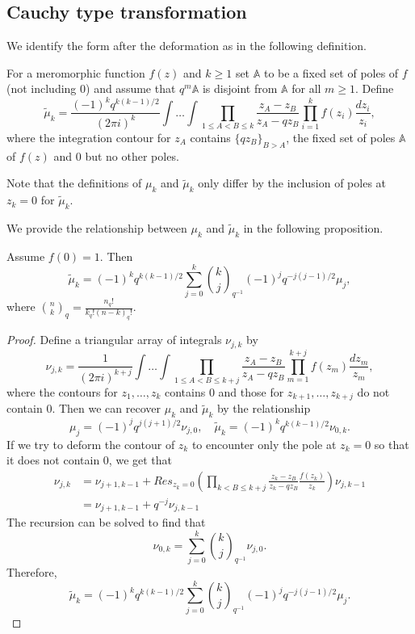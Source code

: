 \subsection{Cauchy type transformation}
We identify the form after the deformation as in the following definition.

\begin{definition}
\label{cauchy-mu}
For a meromorphic function $f(z)$ and $k \ge 1$ set $\mathbb{A}$ to be a fixed set of poles of $f$ (not including $0$) and assume that $q^m \mathbb{A}$ is disjoint from $\mathbb{A}$ for all $m \ge 1$. Define 
$$\tilde{\mu}_k = \frac{(-1)^k q^{k(k-1)/2}}{(2 \pi i)^k} \int \dots \int \prod_{1 \le A < B \le k} \frac{z_A - z_B} {z_A - qz_B} \prod_{i=1}^k f(z_i) \frac{dz_i}{z_i},$$ where the integration contour for $z_A$ contains $\{qz_B\}_{B>A}$, the fixed set of poles $\mathbb{A}$ of $f(z)$ and $0$ but no other poles.
\end{definition}

\begin{remark}
Note that the definitions of $\mu_k$ and $\tilde{\mu}_k$ only differ by the inclusion of poles at $z_k=0$ for $\tilde{\mu}_k$.
\end{remark}

We provide the relationship between $\mu_k$ and $\tilde{\mu}_k$ in the following proposition.

\begin{proposition}
\label{relationship-between-mb-and-cauchy}
Assume $f(0) = 1$. Then
$$\tilde{\mu}_k = (-1)^k q^{k(k-1)/2} \sum_{j=0}^k {k \choose j}_{q^{-1}} (-1)^j q^{-j(j-1)/2} \mu_j,$$
where ${n \choose k}_q = \frac{n_q!}{k_q! (n-k)_q!}$.
\end{proposition}

\begin{proof}
Define a triangular array of integrals $\nu_{j,k}$ by $$\nu_{j,k} = \frac{1}{(2 \pi i)^{k+j}} \int \dots \int \prod_{1 \le A < B \le k+j} \frac{z_A - z_B}{z_A - qz_B} \prod_{m=1}^{k+j} f(z_m) \frac{dz_m}{z_m},$$ where the contours for $z_1, \dots, z_k$ contains $0$ and those for $z_{k+1}, \dots, z_{k+j}$ do not contain $0$. Then we can recover $\mu_k$ and $\tilde{\mu}_k$ by the relationship $$\mu_j = (-1)^j q^{j(j+1)/2} \nu_{j,0}, \quad \tilde{\mu}_k = (-1)^{k} q^{k(k-1)/2} \nu_{0,k}.$$
If we try to deform the contour of $z_k$ to encounter only the pole at $z_k = 0$ so that it does not contain $0$, we get that 
\begin{align*}
\nu_{j,k} &= \nu_{j+1,k-1} + Res_{z_k = 0} \left( \prod_{k < B \le k+j} \frac{z_k - z_B}{z_k - qz_B} \frac{f(z_k)}{z_k} \right) \nu_{j,k-1}\\
&= \nu_{j+1,k-1} + q^{-j} \nu_{j,k-1}
\end{align*}
The recursion can be solved to find that $$\nu_{0,k} = \sum_{j=0}^{k} {k \choose j}_{q^{-1}} \nu_{j,0}.$$ Therefore, $$\tilde{\mu}_k = (-1)^k q^{k(k-1)/2} \sum_{j=0}^k {k \choose j}_{q^{-1}} (-1)^j q^{-j(j-1)/2} \mu_j.$$
\end{proof}

